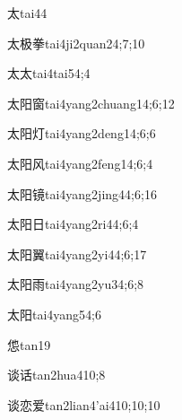 \begin{verbete}{太}{tai4}{4}
\end{verbete}
\begin{verbete}{太极拳}{tai4ji2quan2}{4;7;10}
\end{verbete}
\begin{verbete}{太太}{tai4tai5}{4;4}
\end{verbete}
\begin{verbete}{太阳窗}{tai4yang2chuang1}{4;6;12}
\end{verbete}
\begin{verbete}{太阳灯}{tai4yang2deng1}{4;6;6}
\end{verbete}
\begin{verbete}{太阳风}{tai4yang2feng1}{4;6;4}
\end{verbete}
\begin{verbete}{太阳镜}{tai4yang2jing4}{4;6;16}
\end{verbete}
\begin{verbete}{太阳日}{tai4yang2ri4}{4;6;4}
\end{verbete}
\begin{verbete}{太阳翼}{tai4yang2yi4}{4;6;17}
\end{verbete}
\begin{verbete}{太阳雨}{tai4yang2yu3}{4;6;8}
\end{verbete}
\begin{verbete}{太阳}{tai4yang5}{4;6}
\end{verbete}
\begin{verbete}{怹}{tan1}{9}
\end{verbete}
\begin{verbete}{谈话}{tan2hua4}{10;8}
\end{verbete}
\begin{verbete}{谈恋爱}{tan2lian4'ai4}{10;10;10}
\end{verbete}
